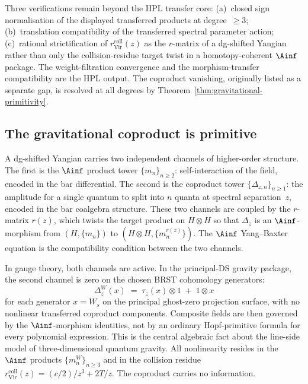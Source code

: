 \begin{remark}\label{rem:ds-hpl-honest-gaps}
Three verifications remain beyond the HPL transfer core:
\textup{(a)}~closed sign normalisation of the displayed transferred
products at degree~$\ge 3$;
\textup{(b)}~translation compatibility of the transferred spectral
parameter action;
\textup{(c)}~rational strictification of
\(r_{\mathrm{Vir}}^{\mathrm{coll}}(z)\) as the \(r\)-matrix of a
dg-shifted Yangian rather than only the collision-residue target twist
in a homotopy-coherent \(\Ainf\) package. The weight-filtration
convergence and the morphism-transfer compatibility are the HPL output.
The coproduct vanishing, originally listed as a separate gap,
is resolved at all degrees by
Theorem~\ref{thm:gravitational-primitivity}.
\end{remark}

\subsection{The gravitational coproduct is primitive}
\label{subsec:gravitational-primitivity}

A dg-shifted Yangian carries two independent channels of
higher-order structure. The first is the $\Ainf$ product tower
$\{m_n\}_{n \ge 2}$: self-interaction of the field, encoded
in the bar differential. The second is the coproduct tower
$\{\Delta_{z,n}\}_{n \ge 1}$: the amplitude for a single
quantum to split into $n$ quanta at spectral separation~$z$,
encoded in the bar coalgebra structure. These two channels
are coupled by the $r$-matrix $r(z)$, which twists the target
product on $H \otimes H$ so that $\Delta_z$ is an
$\Ainf$-morphism from $(H, \{m_n\})$ to
$(H \otimes H, \{m_n^{r(z)}\})$. The $\Ainf$ Yang--Baxter
equation is the compatibility condition between the two channels.

In gauge theory, both channels are active.
In the principal-DS gravity package, the second channel is zero on
the chosen BRST cohomology generators:
\begin{equation}\label{eq:gravitational-primitivity-summary}
\Delta_z^W(x) \;=\; \tau_z(x) \otimes 1 \;+\; 1 \otimes x
\end{equation}
for each generator \(x=W_s\) on the principal ghost-zero projection
surface, with no nonlinear transferred coproduct components. Composite
fields are then governed by the \(\Ainf\)-morphism identities, not by
an ordinary Hopf-primitive formula for every polynomial expression.
This is the central algebraic fact about the line-side model of
three-dimensional quantum gravity.
All nonlinearity resides in the $\Ainf$ products
$\{m_n^W\}_{n \ge 3}$ and in the collision residue
\(r_{\mathrm{Vir}}^{\mathrm{coll}}(z) = (c/2)/z^3 + 2T/z\). The coproduct
carries no information.

